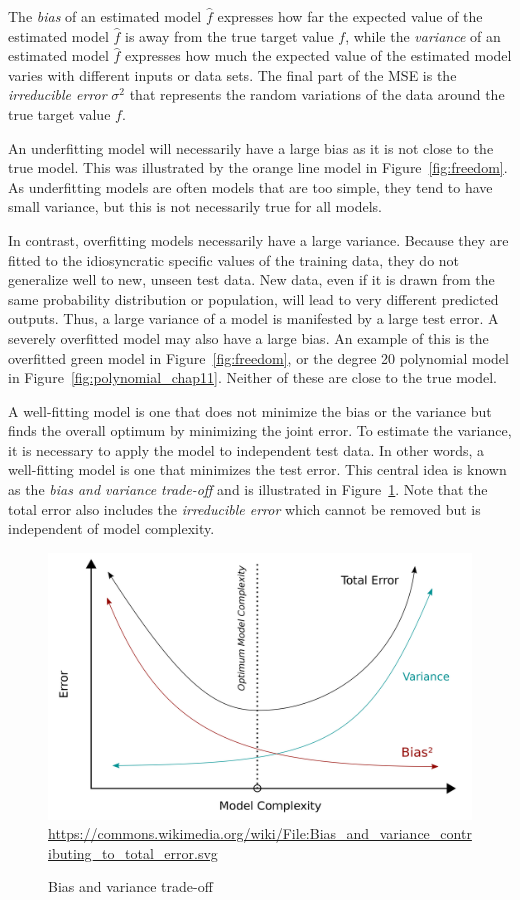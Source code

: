 The \emph{bias} of an estimated model $\hat{f}$ expresses how far the expected value of the estimated model $\hat{f}$ is away from the true target value $f$, while the \emph{variance} of an estimated model $\hat{f}$ expresses how much the expected value of the estimated model varies with different inputs or data sets. The final part of the MSE is the \emph{irreducible error} $\sigma^2$ that represents the random variations of the data around the true target value $f$.

An underfitting model will necessarily have a large bias as it is not close to the true model. This was illustrated by the orange line model in Figure~\ref{fig:freedom}. As underfitting models are often models that are too simple, they tend to have small variance, but this is not necessarily true for all models. 

In contrast, overfitting models necessarily have a large variance. Because they are fitted to the idiosyncratic specific values of the training data, they do not generalize well to new, unseen test data. New data, even if it is drawn from the same probability distribution or population, will lead to very different predicted outputs. Thus, a large variance of a model is manifested by a large test error. A severely overfitted model may also have a large bias. An example of this is the overfitted green model in Figure~\ref{fig:freedom}, or the degree 20 polynomial model in Figure~\ref{fig:polynomial_chap11}. Neither of these are close to the true model. 

A well-fitting model is one that does not minimize the bias or the variance but finds the overall optimum by minimizing the joint error. To estimate the variance, it is necessary to apply the model to independent test data. In other words, a well-fitting model is one that minimizes the test error. This central idea is known as the \emph{bias and variance trade-off} and is illustrated in Figure~\ref{fig:biasvariancetradeoff}. Note that the total error also includes the \emph{irreducible error} which cannot be removed but is independent of model complexity.

\begin{figure}
\centering
\centering
\includegraphics[width=.75\textwidth]{bias_variance.png}\\

\scriptsize \url{https://commons.wikimedia.org/wiki/File:Bias_and_variance_contributing_to_total_error.svg}
\caption{Bias and variance trade-off}
\label{fig:biasvariancetradeoff}
\end{figure}

